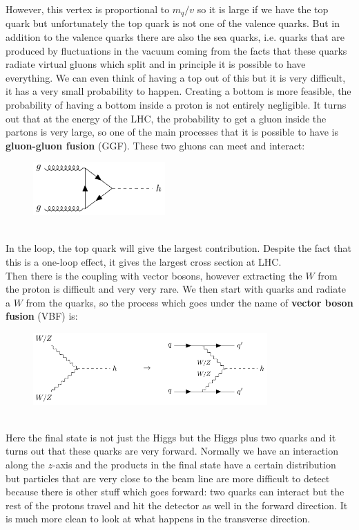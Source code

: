 \documentclass[../main.tex]{subfiles}
\begin{document}
\newpage
However, this vertex is proportional to $m_q/v$ so it is large if we have the top quark but unfortunately the top quark is not one of the valence quarks. But in addition to the valence quarks there are also the sea quarks, i.e. quarks that are produced by fluctuations in the vacuum coming from the facts that these quarks radiate  virtual gluons which split and in principle it is possible to have everything. We can even think of having a top out of this but it is very difficult, it has a very small probability to happen. Creating a bottom is more feasible, the probability of having a bottom inside a proton is not entirely negligible. It turns out that at the energy of the LHC, the probability to get a gluon inside the partons is very large, so one of the main processes that it is possible to have is \textbf{gluon-gluon fusion} (GGF). These two gluons can meet and interact: 
\begin{figure}[h]
    \centering
    \includegraphics[width=0.45\textwidth]{Images/ggf.pdf}
    \caption*{}
\end{figure}\\
In the loop, the top quark will give the largest contribution. Despite the fact that this is a one-loop effect, it gives the largest cross section at LHC.\\
Then there is the coupling with vector bosons, however extracting the $W$ from the proton is difficult and very very rare. We then start with quarks and radiate a $W$ from the quarks, so the process which goes under the name of \textbf{vector boson fusion} (VBF) is:
\begin{figure}[h]
    \centering
    \includegraphics[width=0.8\textwidth]{Images/vbf.pdf}
    \caption*{}
\end{figure}\\
Here the final state is not just the Higgs but the Higgs plus two quarks and it turns out that these quarks are very forward. Normally we have an interaction along the $z$-axis and the products in the final state have a certain distribution but particles that are very close to the beam line are more difficult to detect because there is other stuff which goes forward: two quarks can interact but the rest of the protons travel and hit the detector as well in the forward direction. It is much more clean to look at what happens in the transverse direction.\\
\end{document}
